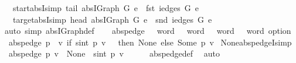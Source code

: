 \begin{isabellebody}
\ \ \ start{\isacharunderscore}absI{\isacharbrackleft}simp{\isacharbrackright}{\isacharcolon}\ {\isachardoublequoteopen}tail\ {\isacharparenleft}abs{\isacharunderscore}IGraph\ G{\isacharparenright}\ e\ {\isacharequal}\ fst\ {\isacharparenleft}iedges\ G\ e{\isacharparenright}{\isachardoublequoteclose}\isanewline
\ \ \ target{\isacharunderscore}absI{\isacharbrackleft}simp{\isacharbrackright}{\isacharcolon}\ {\isachardoublequoteopen}head\ {\isacharparenleft}abs{\isacharunderscore}IGraph\ G{\isacharparenright}\ e\ {\isacharequal}\ snd\ {\isacharparenleft}iedges\ G\ e{\isacharparenright}{\isachardoublequoteclose}\isanewline
%
\isadelimproof
\ \ %
\endisadelimproof
%
\isatagproof
{}\isamarkupfalse%
\ {\isacharparenleft}auto\ simp{\isacharcolon}\ abs{\isacharunderscore}IGraph{\isacharunderscore}def{\isacharparenright}%
\endisatagproof
{\isafoldproof}%
%
\isadelimproof
\isanewline
%
\endisadelimproof
\isanewline
{}\isamarkupfalse%
\ \isanewline
\ \ abs{\isacharunderscore}pedge\ {\isacharcolon}{\isacharcolon}\ {\isachardoublequoteopen}{\isacharparenleft}{}{}\ word\ {\isasymRightarrow}\ {}{}\ word{\isacharparenright}\ {\isasymRightarrow}\ {}{}\ word\ {\isasymRightarrow}\ {}{}\ word\ option{\isachardoublequoteclose}\ \isanewline
{}\isanewline
\ \ {\isachardoublequoteopen}abs{\isacharunderscore}pedge\ p\ {\isasymequiv}\ {\isacharparenleft}{\isasymlambda}v{\isachardot}\ if\ sint\ {\isacharparenleft}p\ v{\isacharparenright}\ {\isacharless}\ {}\ then\ None\ else\ Some\ {\isacharparenleft}p\ v{\isacharparenright}{\isacharparenright}{\isachardoublequoteclose}\isanewline
\isanewline
{}\isamarkupfalse%
\ None{\isacharunderscore}abs{\isacharunderscore}pedgeI{\isacharbrackleft}simp{\isacharbrackright}{\isacharcolon}\ \isanewline
\ \ {\isachardoublequoteopen}{\isacharparenleft}{\isacharparenleft}abs{\isacharunderscore}pedge\ p{\isacharparenright}\ v\ {\isacharequal}\ None{\isacharparenright}\ {\isacharequal}\ {\isacharparenleft}sint\ {\isacharparenleft}p\ v{\isacharparenright}\ {\isacharless}\ {}{\isacharparenright}{\isachardoublequoteclose}\isanewline
%
\isadelimproof
\ \ %
\endisadelimproof
%
\isatagproof
{}\isamarkupfalse%
\ abs{\isacharunderscore}pedge{\isacharunderscore}def\ \isamarkupfalse%
\ auto%
\endisatagproof
{\isafoldproof}%
%
\isadelimproof
\isanewline
%
\endisadelimproof
\isanewline
{}\isamarkupfalse%

\end{isabellebody}
